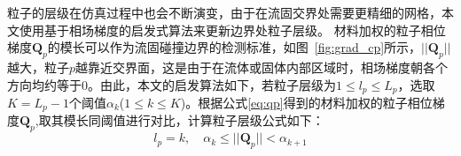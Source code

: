 
\begin{algorithm}
    \caption{粒子层级驱动网格划分算法}
    \label{alg:partlevel2grid}
    
    
    
    

\end{algorithm}


粒子的层级在仿真过程中也会不断演变，由于在流固交界处需要更精细的网格，本文使用基于相场梯度的启发式算法来更新边界处粒子层级。
材料加权的粒子相位梯度$\mathbf{Q}_p$的模长可以作为流固碰撞边界的检测标准，如图~\ref{fig:grad_cp}所示，$||\mathbf{Q}_p||$越大，粒子$p$越靠近交界面，这是由于在流体或固体内部区域时，相场梯度朝各个方向均约等于0。由此，本文的启发算法如下，若粒子层级为$1 \leq l_p \leq L_p$，选取$K = L_p - 1$个阈值$\alpha_k$($1 \leq k \leq K$)。根据公式\ref{eq:qp}得到的材料加权的粒子相位梯度$\mathbf{Q}_p$,取其模长同阈值进行对比，计算粒子层级公式如下：
\begin{equation}
    l_p = k,\quad \alpha_k \leq ||\mathbf{Q}_p|| < \alpha_{k+1}
\end{equation}

